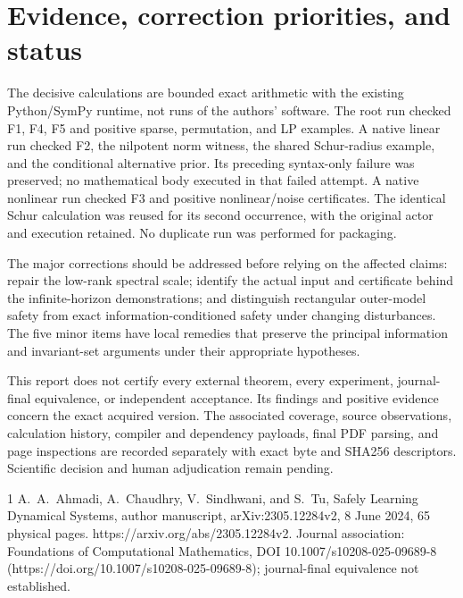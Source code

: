 \documentclass[10pt]{article}
\begin{document}
\section*{Evidence, correction priorities, and status}
The decisive calculations are bounded exact arithmetic with the existing Python/SymPy runtime, not runs of the authors’ software. The root run checked F1, F4, F5 and positive sparse, permutation, and LP examples. A native linear run checked F2, the nilpotent norm witness, the shared Schur-radius example, and the conditional alternative prior. Its preceding syntax-only failure was preserved; no mathematical body executed in that failed attempt. A native nonlinear run checked F3 and positive nonlinear/noise certificates. The identical Schur calculation was reused for its second occurrence, with the original actor and execution retained. No duplicate run was performed for packaging.\par
The major corrections should be addressed before relying on the affected claims: repair the low-rank spectral scale; identify the actual input and certificate behind the infinite-horizon demonstrations; and distinguish rectangular outer-model safety from exact information-conditioned safety under changing disturbances. The five minor items have local remedies that preserve the principal information and invariant-set arguments under their appropriate hypotheses.\par
This report does not certify every external theorem, every experiment, journal-final equivalence, or independent acceptance. Its findings and positive evidence concern the exact acquired version. The associated coverage, source observations, calculation history, compiler and dependency payloads, final PDF parsing, and page inspections are recorded separately with exact byte and SHA256 descriptors. Scientific decision and human adjudication remain pending.\par
1 A. A. Ahmadi, A. Chaudhry, V. Sindhwani, and S. Tu, Safely Learning Dynamical Systems, author manuscript, arXiv:2305.12284v2, 8 June 2024, 65 physical pages. https://arxiv.org/abs/2305.12284v2. Journal association: Foundations of Computational Mathematics, DOI 10.1007/s10208-025-09689-8 (https://doi.org/10.1007/s10208-025-09689-8); journal-final equivalence not established.\par
\end{document}
